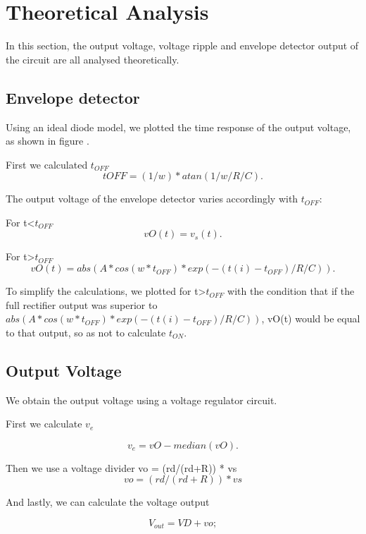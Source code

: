 \section{Theoretical Analysis}
\label{sec:analysis}

In this section, the output voltage, voltage ripple and envelope detector output of the circuit are all analysed theoretically.

\subsection{Envelope detector}

Using an ideal diode model, we plotted the time response of the output voltage, as shown in figure .

First we calculated $t_{OFF}$
\begin{equation}
  tOFF = (1/w) * atan(1/w/R/C).
  \label{eq:menor toff}
\end{equation}

The output voltage of the envelope detector varies accordingly with $t_{OFF}$:

For t<$t_{OFF}$
\begin{equation}
  vO(t) = v_s(t).
  \label{eq:menor toff}
\end{equation}

For t>$t_{OFF}$
\begin{equation}
  vO(t) = abs(A*cos(w*t_{OFF})*exp(-(t(i)-t_{OFF})/R/C)).
  \label{eq:maior toff}
\end{equation}

To simplify the calculations, we plotted for t>$t_{OFF}$ with the condition that if the full rectifier output was superior to $abs(A*cos(w*t_{OFF})*exp(-(t(i)-t_{OFF})/R/C))$, vO(t) would be equal to that output, so as not to calculate $t_{ON}$.

\subsection{Output Voltage}

We obtain the output voltage using a voltage regulator circuit.

First we calculate $v_e$ 

\begin{equation}
  v_e = vO-median(vO).
  \label{eq:ve}
\end{equation}

Then we use a voltage divider
vo = (rd/(rd+R)) * vs
\begin{equation}
  vo = (rd/(rd+R)) * vs
  \label{eq:vo}
\end{equation}

And lastly, we can calculate the voltage output

\begin{equation}
  V_{out} = VD + vo;
  \label{eq:Vout}
\end{equation}
